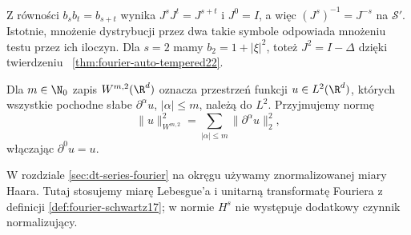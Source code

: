 Z równości $b_sb_t=b_{s+t}$ wynika
$J^sJ^t=J^{s+t}$ i $J^0=I$, a więc
$(J^s)^{-1}=J^{-s}$ na $\mathcal S'$.
Istotnie, mnożenie dystrybucji przez dwa takie
symbole odpowiada mnożeniu testu przez ich iloczyn.
Dla $s=2$ mamy $b_2=1+|\xi|^2$, toteż
$J^2=I-\Delta$ dzięki twierdzeniu
~\ref{thm:fourier-auto-tempered22}.

Dla $m\in\N_0$ zapis $W^{m,2}(\R^d)$ oznacza
przestrzeń funkcji $u\in L^2(\R^d)$, których
wszystkie pochodne słabe $\partial^\alpha u$,
$|\alpha|\le m$, należą do $L^2$.
Przyjmujemy normę
\[
 \|u\|_{W^{m,2}}^2=\sum_{|\alpha|\le m}
 \|\partial^\alpha u\|_2^2,
\]
włączając $\partial^0u=u$.

\begin{uwaga}
W rozdziale \ref{sec:dt-series-fourier} na okręgu używamy
znormalizowanej miary Haara. Tutaj stosujemy miarę
Lebesgue'a i unitarną transformatę Fouriera z definicji
\ref{def:fourier-schwartz17}; w normie $H^s$ nie występuje
dodatkowy czynnik normalizujący.
\end{uwaga}

